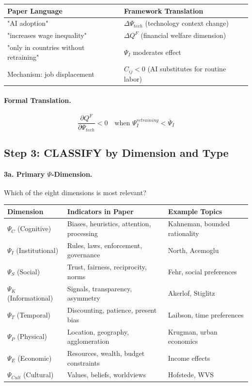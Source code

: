 \begin{center}
\renewcommand{\arraystretch}{1.3}
\begin{tabular}{|l|l|}
\hline
\textbf{Paper Language} & \textbf{Framework Translation} \\
\hline
"AI adoption" & $\Delta \Psi_{tech}$ (technology context change) \\
"increases wage inequality" & $\Delta Q^F$ (financial welfare dimension) \\
"only in countries without retraining" & $\Psi_I$ moderates effect \\
Mechanism: job displacement & $C_{ij} < 0$ (AI substitutes for routine labor) \\
\hline
\end{tabular}
\end{center}

\paragraph{Formal Translation.}
\begin{equation}
\frac{\partial Q^F}{\partial \Psi_{tech}} < 0 \quad \text{when } \Psi_I^{retraining} < \bar{\Psi}_I
\end{equation}

\subsection{Step 3: CLASSIFY by Dimension and Type}

\paragraph{3a. Primary $\Psi$-Dimension.}
Which of the eight dimensions is most relevant?

\begin{center}
\renewcommand{\arraystretch}{1.2}
\begin{tabular}{|l|l|l|}
\hline
\textbf{Dimension} & \textbf{Indicators in Paper} & \textbf{Example Topics} \\
\hline
$\Psi_C$ (Cognitive) & Biases, heuristics, attention, processing & Kahneman, bounded rationality \\
$\Psi_I$ (Institutional) & Rules, laws, enforcement, governance & North, Acemoglu \\
$\Psi_S$ (Social) & Trust, fairness, reciprocity, norms & Fehr, social preferences \\
$\Psi_K$ (Informational) & Signals, transparency, asymmetry & Akerlof, Stiglitz \\
$\Psi_T$ (Temporal) & Discounting, patience, present bias & Laibson, time preferences \\
$\Psi_P$ (Physical) & Location, geography, agglomeration & Krugman, urban economics \\
$\Psi_E$ (Economic) & Resources, wealth, budget constraints & Income effects \\
$\Psi_{Cult}$ (Cultural) & Values, beliefs, worldviews & Hofstede, WVS \\
\hline
\end{tabular}
\end{center}

